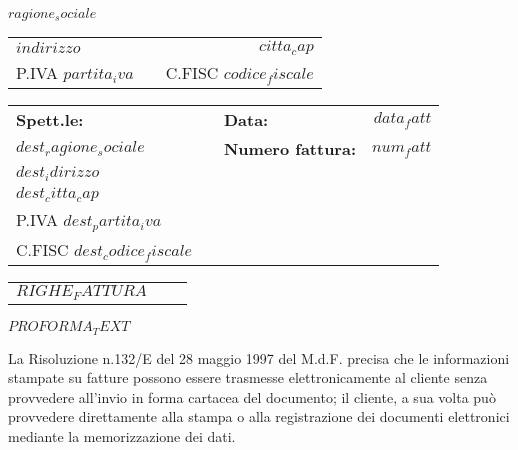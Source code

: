\documentclass{invoice} %
\def \tab {\hspace*{3ex}} %
\begin{document}
\begin{center}
\Huge\bf $ragione_sociale$ %
\end{center}
\begin{tabularx}{\textwidth}{l X   r}
$indirizzo$ & &  $citta_cap$   \\ [0.1ex]
P.IVA $partita_iva$ & &  C.FISC $codice_fiscale$ \\ [0.1ex]
\end{tabularx}

\bigskip
\bigskip

\begin{tabularx}{\textwidth}{l X l  r}

{\bf Spett.le:}  & &   {\bf Data:}  & $data_fatt$   \\
\tab  $dest_ragione_sociale$  & &  {\bf Numero fattura:}   & $num_fatt$ \\ 
\tab $dest_idirizzo$  & &  & \\
\tab $dest_citta_cap$  & &   & \\
\tab P.IVA $dest_partita_iva$  & &  &  \\ 
\tab C.FISC $dest_codice_fiscale$ & &  &  \\ 
\end{tabularx}

\bigskip
\bigskip
{} %
\bigskip
\begin{center}
 \begin{tabularx}{\textwidth}{X  c r }

$RIGHE_FATTURA$
\end{tabularx}
\end{center}


$PROFORMA_TEXT$

\bigskip
\vspace*{\fill}
La Risoluzione n.132/E del 28 maggio 1997 del M.d.F. precisa che le informazioni stampate su fatture
possono essere trasmesse elettronicamente al cliente senza provvedere all'invio in forma cartacea
del documento; il cliente, a sua volta può provvedere direttamente alla stampa o alla registrazione
dei documenti elettronici mediante la memorizzazione dei dati.

\end{document}
